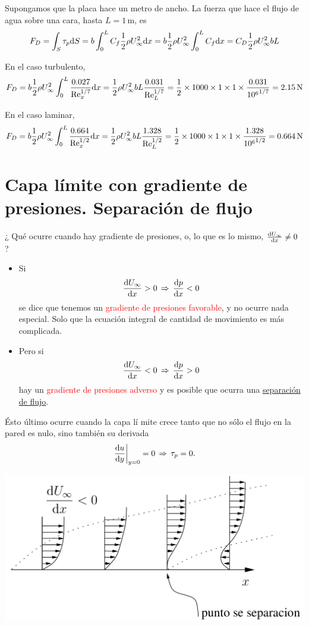 		Supongamos que la placa hace un metro de ancho. La fuerza que hace
		el flujo de agua sobre una cara, hasta $L=1\,\text{m}$, es 
			\[
			F_{D}=\int_{S}\tau_{p}\text{d} S=b\int_{0}^{L}C_{f}\frac{1}{2}\rho U_{\infty}^{2}\text{d} x=b\frac{1}{2}\rho U_{\infty}^{2}\int_{0}^{L}C_{f}\text{d} x=C_{D}\frac{1}{2}\rho U_{\infty}^{2}bL
			\]
		
		
		En el caso turbulento,
			\[
			F_{D}=b\frac{1}{2}\rho U_{\infty}^{2}\int_{0}^{L}\frac{0.027}{\text{Re}_{x}^{1/7}}\text{d} x=\frac{1}{2}\rho U_{\infty}^{2}bL\frac{0.031}{\text{Re}_{L}^{1/7}}=\frac{1}{2}\times1000\times1\times1\times\frac{0.031}{{10^{6}}^{1/7}}=2.15\,\text{N}
			\]
		
		
		En el caso laminar,
			\[
			F_{D}=b\frac{1}{2}\rho U_{\infty}^{2}\int_{0}^{L}\frac{0.664}{\text{Re}_{x}^{1/2}}\text{d} x=\frac{1}{2}\rho U_{\infty}^{2}bL\frac{1.328}{\text{Re}_{L}^{1/2}}=\frac{1}{2}\times1000\times1\times1\times\frac{1.328}{{10^{6}}^{1/2}}=0.664\,\text{N}
			\]
		

\section{Capa límite con gradiente de presiones. Separación de flujo}

	
	¿ Qué ocurre cuando hay gradiente de presiones, o, lo que es lo mismo,
	$\frac{\textrm{d} U_{\infty}}{\textrm{d} x}\neq0$ ?
	\begin{itemize}
		\item Si {\small{}
			\[
			\frac{\textrm{d} U_{\infty}}{\textrm{d} x}>0\,\Rightarrow\,\frac{\textrm{d} p}{\textrm{d} x}<0
			\]
		} se dice que tenemos un \textcolor{red}{gradiente de presiones favorable},
		y no ocurre nada especial. Solo que la ecuación integral de cantidad
		de movimiento es más complicada.
		\item Pero si {\small{}
			\[
			\frac{\textrm{d} U_{\infty}}{\textrm{d} x}<0\,\Rightarrow\,\frac{\textrm{d} p}{\textrm{d} x}>0
			\]
		} hay un \textcolor{red}{gradiente de presiones adverso} y es posible
		que ocurra una \textcolor{red}{\href{https://en.wikipedia.org/wiki/Flow_separation}{separación de flujo}}.
	\end{itemize}
	Ésto último ocurre cuando la capa lí mite crece tanto que no sólo
	el flujo en la pared es nulo, sino también su derivada {\small{}
		\[
		\left.\frac{\textrm{d} u}{\textrm{d} y}\right|_{y=0}=0\,\Rightarrow\,\tau_{p}=0.
		\]
	}{\small\par}

	
\begin{center}
	\includegraphics[width=0.7\linewidth]{TeX_files/chapter08-CapaLimite/sepa}
\end{center}


